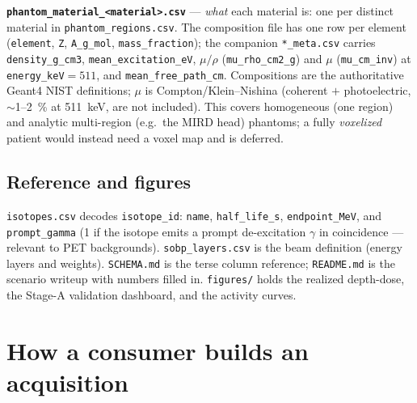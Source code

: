 \documentclass[11pt]{article}
\newcommand{\file}[1]{\texttt{#1}}
\begin{document}
\textbf{\file{phantom\_material\_<material>.csv}} --- \emph{what} each material
is: one per distinct material in \file{phantom\_regions.csv}. The composition
file has one row per element (\file{element}, \file{Z}, \file{A\_g\_mol},
\file{mass\_fraction}); the companion \file{*\_meta.csv} carries
\file{density\_g\_cm3}, \file{mean\_excitation\_eV}, $\mu/\rho$
(\file{mu\_rho\_cm2\_g}) and $\mu$ (\file{mu\_cm\_inv}) at \file{energy\_keV}$=511$,
and \file{mean\_free\_path\_cm}. Compositions are the authoritative Geant4 NIST
definitions; $\mu$ is Compton/Klein--Nishina (coherent $+$ photoelectric,
$\sim$1--\SI{2}{\percent} at \SI{511}{keV}, are not included). This covers
homogeneous (one region) and analytic multi-region (e.g.\ the MIRD head)
phantoms; a fully \emph{voxelized} patient would instead need a voxel map and is
deferred.

\subsection{Reference and figures}

\file{isotopes.csv} decodes \file{isotope\_id}: \file{name},
\file{half\_life\_s}, \file{endpoint\_MeV}, and \file{prompt\_gamma} (1 if the
isotope emits a prompt de-excitation $\gamma$ in coincidence --- relevant to PET
backgrounds). \file{sobp\_layers.csv} is the beam definition (energy layers and
weights). \file{SCHEMA.md} is the terse column reference; \file{README.md} is the
scenario writeup with numbers filled in. \file{figures/} holds the realized
depth-dose, the Stage-A validation dashboard, and the activity curves.

\section{How a consumer builds an acquisition}
\label{sec:use}
\end{document}
